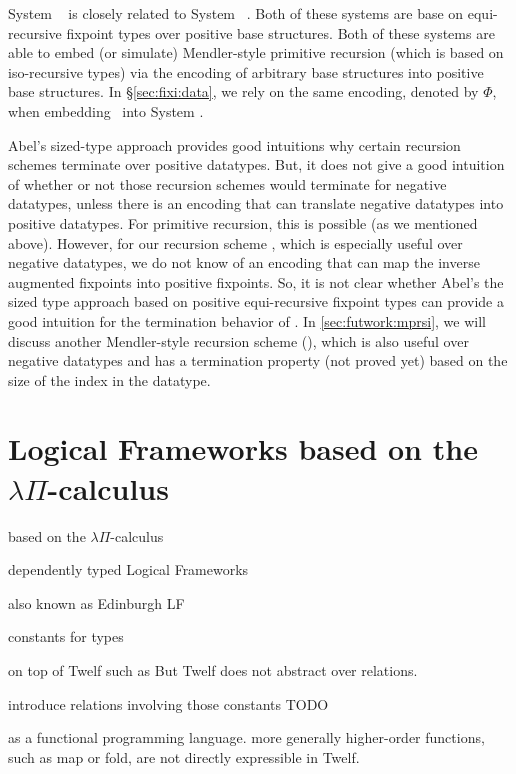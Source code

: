 System \Fwhat\ \cite{abel06phd} is closely related to
System \Fixw\ \cite{AbeMat04}. Both of these systems are base on
equi-recursive fixpoint types over positive base structures.
Both of these systems are able to embed (or simulate) Mendler-style
primitive recursion (which is based on iso-recursive types) via
the encoding \cite{Geu92} of arbitrary base structures into
positive base structures. In \S\ref{sec:fixi:data}, we rely on
the same encoding, denoted by $\Phi$, when embedding \MPr\ into System \Fixi.

Abel's sized-type approach provides good intuitions why 
certain recursion schemes terminate over positive datatypes.
But, it does not give a good intuition of whether or not
those recursion schemes would terminate for negative datatypes,
unless there is an encoding that can translate negative datatypes into
positive datatypes. For primitive recursion, this is possible (as we
mentioned above). However, for our recursion scheme \MsfIt, which is
especially useful over negative datatypes, we do not know of an encoding
that can map the inverse augmented fixpoints into positive fixpoints.
So, it is not clear whether Abel's the sized type approach based on
positive equi-recursive fixpoint types can provide a good intuition
for the termination behavior of \MsfIt.  In \ref{sec:futwork:mprsi},
we will discuss another Mendler-style recursion scheme (\mprsi), which
is also useful over negative datatypes and has a termination property
(not proved yet) based on the size of the index in the datatype.

\section{Logical Frameworks based on the $\lambda\Pi$-calculus}

based on the $\lambda\Pi$-calculus

dependently typed Logical Frameworks 

also known as Edinburgh LF \cite{TODO}

constants for types

on top of Twelf such as
But Twelf does not abstract over relations.

introduce relations involving those constants
TODO

as a functional programming language.
more generally higher-order functions, such as map or fold,
are not directly expressible in Twelf.

